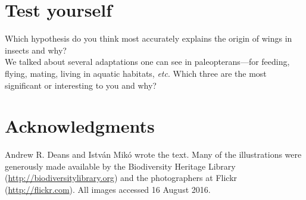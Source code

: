 \documentclass[letterpaper, 11pt]{article}
\begin{document}
\section*{Test yourself}
\noindent{}Which hypothesis do you think most accurately explains the origin of wings in insects and why?\\

\noindent{}We talked about several adaptations one can see in paleopterans---for feeding, flying, mating, living in aquatic habitats, \textit{etc}. Which three are the most significant or interesting to you and why?\\

\section*{Acknowledgments}
Andrew R. Deans and Istv\'an Mik\'o wrote the text. Many of the illustrations were generously made available by the Biodiversity Heritage Library (\url{http://biodiversitylibrary.org}) and the photographers at Flickr (\url{http://flickr.com}). All images accessed 16 August 2016.
\FloatBarrier


\end{document}
